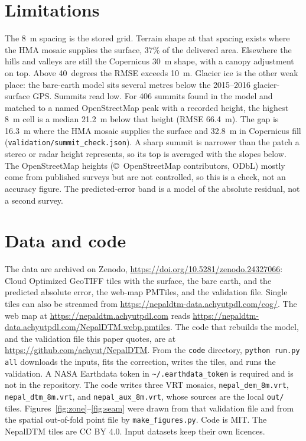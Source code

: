 \documentclass[11pt]{article}
\begin{document}
\section{Limitations}

The 8~m spacing is the stored grid.
Terrain shape at that spacing exists where the HMA mosaic supplies the surface, 37\% of the delivered area.
Elsewhere the hills and valleys are still the Copernicus 30~m shape, with a canopy adjustment on top.
Above 40~degrees the RMSE exceeds 10~m.
Glacier ice is the other weak place: the bare-earth model sits several metres below the 2015--2016 glacier-surface GPS.
Summits read low.
For 406 summits found in the model and matched to a named OpenStreetMap peak with a recorded height, the highest 8~m cell is a median 21.2~m below that height (RMSE 66.4~m).
The gap is 16.3~m where the HMA mosaic supplies the surface and 32.8~m in Copernicus fill (\texttt{validation/summit\_check.json}).
A sharp summit is narrower than the patch a stereo or radar height represents, so its top is averaged with the slopes below.
The OpenStreetMap heights (\copyright~OpenStreetMap contributors, ODbL) mostly come from published surveys but are not controlled, so this is a check, not an accuracy figure.
The predicted-error band is a model of the absolute residual, not a second survey.

\section{Data and code}

The data are archived on Zenodo, \url{https://doi.org/10.5281/zenodo.24327066}: Cloud Optimized GeoTIFF tiles
with the surface, the bare earth, and the predicted absolute error, the web-map PMTiles, and the validation file.
Single tiles can also be streamed from \url{https://nepaldtm-data.achyutpdl.com/cog/}.
The web map at \url{https://nepaldtm.achyutpdl.com} reads
\url{https://nepaldtm-data.achyutpdl.com/NepalDTM.webp.pmtiles}.
The code that rebuilds the model, and the validation file this paper quotes, are at
\url{https://github.com/achyut/NepalDTM}.
From the \texttt{code} directory, \texttt{python run.py all} downloads the inputs, fits the correction, writes the tiles, and runs the validation.
A NASA Earthdata token in \texttt{\textasciitilde/.earthdata\_token} is required and is not in the repository.
The code writes three VRT mosaics, \texttt{nepal\_dem\_8m.vrt}, \texttt{nepal\_dtm\_8m.vrt}, and \texttt{nepal\_aux\_8m.vrt}, whose sources are the local \texttt{out/} tiles.
Figures~\ref{fig:zone}--\ref{fig:seam} were drawn from that validation file and from the spatial out-of-fold point file by \texttt{make\_figures.py}.
Code is MIT.
The NepalDTM tiles are CC BY 4.0.
Input datasets keep their own licences.



\end{document}
